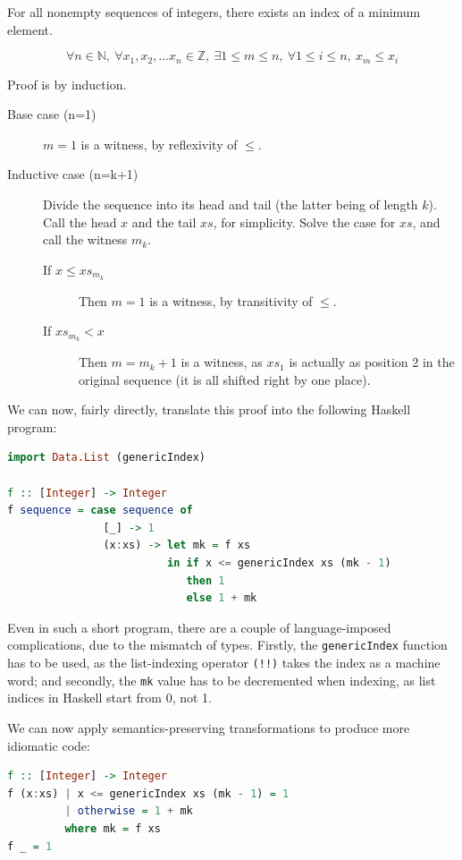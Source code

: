 \begin{example}
\label{exmpl:lit-extraction}
For all nonempty sequences of integers, there exists an index of a
minimum element.

\[\forall n \in \mathbb N,\
\forall x_{1}, x_{2}, \ldots x_{n} \in \mathbb Z,\ 
\exists 1 \leq m \leq n,\ 
\forall 1 \leq i \leq n,\ 
x_{m} \leq x_{i}\]

Proof is by induction.

\begin{description}
  \item[Base case (n=1)] $m = 1$ is a witness, by reflexivity of
    $\leq$.

  \item[Inductive case (n=k+1)] Divide the sequence into its head
    and tail (the latter being of length $k$). Call the head $x$ and
    the tail $xs$, for simplicity. Solve the case for $xs$, and call
    the witness $m_{k}$.
    \begin{description}
      \item[If $x \leq xs_{m_k}$] Then $m = 1$ is a witness, by
        transitivity of $\leq$.

      \item[If $xs_{m_k} < x$] Then $m = m_{k} + 1$ is a witness, as
        $xs_{1}$ is actually as position 2 in the original sequence
        (it is all shifted right by one place).
    \end{description}
\end{description}

We can now, fairly directly, translate this proof into the following
Haskell program:

\begin{lstlisting}[language=haskell]
import Data.List (genericIndex)

f :: [Integer] -> Integer
f sequence = case sequence of
               [_] -> 1
               (x:xs) -> let mk = f xs
                         in if x <= genericIndex xs (mk - 1)
                            then 1
                            else 1 + mk
\end{lstlisting}

Even in such a short program, there are a couple of language-imposed
complications, due to the mismatch of types. Firstly, the
\texttt{genericIndex} function has to be used, as the list-indexing
operator \texttt{(!!)} takes the index as a machine word; and
secondly, the \texttt{mk} value has to be decremented when indexing,
as list indices in Haskell start from 0, not 1.

We can now apply semantics-preserving transformations to produce more
idiomatic code:

\begin{lstlisting}[language=haskell]
f :: [Integer] -> Integer
f (x:xs) | x <= genericIndex xs (mk - 1) = 1
         | otherwise = 1 + mk
         where mk = f xs
f _ = 1
\end{lstlisting}
\end{example}


